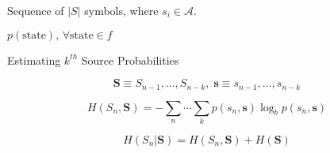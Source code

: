 \documentclass[a4paper, twocolumn]{article}
\begin{document}
        \begin{algorithm}
            \begin{algorithmic}
                \REQUIRE Sequence of \(|S|\) symbols,\: where \(s_i \in \mathcal{A}.\)
                    \ENDFOR
                \ENDFOR

                \ENDFOR

                \RETURN \(p(\mathrm{state}),\, \forall \mathrm{state} \in f\)
            \end{algorithmic}
            \caption{Estimating \(k^{th}\) Source Probabilities}
            \label{alg:entropy}
        \end{algorithm}

        \[\bm{S} \equiv S_{n-1}, \dots, S_{n-k},\; \bm{s} \equiv s_{n-1}, \dots, s_{n-k} \]

        \begin{equation} \label{eq:joint_entropy}
            H(S_n, \bm{S}) = - \sum_n \cdots \sum_k p(s_n, \bm{s}) \log_b p(s_n, \bm{s})
        \end{equation}

        \begin{equation} \label{eq:conditional_entropy}
            H(S_n | \bm{S}) = H(S_n, \bm{S}) + H(\bm{S})
        \end{equation}
\end{document}
